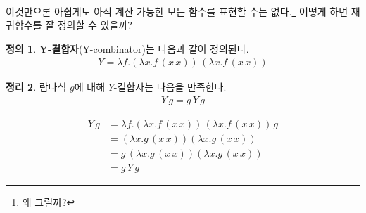 \documentclass[b5paper, 11pt]{book}
\theoremstyle{definition}
\newtheorem{defn}{정의}[chapter]
\newtheorem{thm}[defn]{정리}
\newenvironment{pf*}{\pushQED{\qed}\pf}
{\popQED\endpf}
\begin{document}
이것만으론 아쉽게도 아직 계산 가능한 모든 함수를 표현할 수는 없다.\footnote{왜 그럴까?} 어떻게 하면 재귀함수를 잘 정의할 수 있을까? 
\begin{defn}
    \textbf{Y-결합자}(Y-combinator)는 다음과 같이 정의된다.
    \begin{align*}
        Y = \lambda f.(\lambda x. f \, (x\, x)) \, (\lambda x. f \, (x \, x))
    \end{align*}
\end{defn}
\begin{thm}
    람다식 $g$에 대해 $Y$-결합자는 다음을 만족한다.
    \begin{align*}
        Y \, g = g \, Y \, g
    \end{align*}
\end{thm}
\begin{pf*}
    \begin{align*}
        Y \, g &= \lambda f.(\lambda x. f \, (x\, x)) \, (\lambda x. f \, (x \, x)) \, g \\
        &= (\lambda x. g \, (x \, x)) (\lambda x .g \, (x \, x)) \\ 
        &= g \,  (\lambda x. g \, (x \, x)) (\lambda x .g \, (x \, x))  \\ 
        &= g \, Y \, g
    \end{align*}
\end{pf*}
\end{document}
